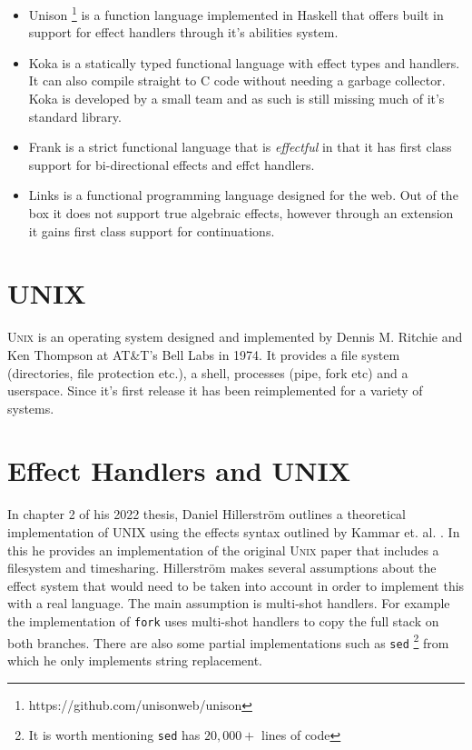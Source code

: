 \documentclass[logo,bsc,singlespacing,parskip]{infthesis}
\begin{document}
\begin{itemize}
        \item{Unison \footnote{https://github.com/unisonweb/unison} is a
function language implemented in Haskell that offers built in support for effect
handlers through it's abilities system.}
        \item{Koka \cite{DBLP:journals/corr/Leijen14} is a statically typed
functional language with effect types and handlers. It can also compile
straight to C code without needing a garbage collector. Koka is developed by a
small team and as such is still missing much of it's standard library.}
        \item{Frank \cite{DBLP:conf/popl/LindleyMM17} is a strict functional
language that is \emph{effectful} in that it has first class support for
bi-directional effects and effct handlers. }
        \item{Links \cite{DBLP:conf/fmco/CooperLWY06} is a functional
programming language designed for the web. Out of the box it does not support
true algebraic effects, however through an extension
\cite{DBLP:conf/icfp/HillerstromL16} it gains first class support for
continuations.}
\end{itemize}


\section{\textsc{UNIX}}

\textsc{Unix} \cite{ritchie1978unix} is an operating system designed and
implemented by Dennis M. Ritchie and Ken Thompson at AT\&T's Bell Labs in 1974.
It provides a file system (directories, file protection etc.), a shell,
processes (pipe, fork etc) and a userspace. Since it's first release it has been
reimplemented for a variety of systems.

\section{Effect Handlers and UNIX}

In chapter 2 of his 2022 thesis, Daniel Hillerstr\"{o}m
\cite{hillerstrom2022foundations} outlines a theoretical implementation of UNIX
using the effects syntax outlined by Kammar et. al. \cite{kammar2013handlers}.
In this he provides an implementation of the original \textsc{Unix} paper
\cite{ritchie1978unix} that includes a filesystem and timesharing.
Hillerstr\"{o}m makes several assumptions about the effect system that would
need to be taken into account in order to implement this with a real language.
The main assumption is multi-shot handlers. For example the implementation of
\texttt{fork} uses multi-shot handlers to copy the full stack on both branches.
There are also some partial implementations such as \texttt{sed} \footnote{It is
worth mentioning \texttt{sed} has $20,000+$ lines of code} from which he only
implements string replacement.
\end{document}
